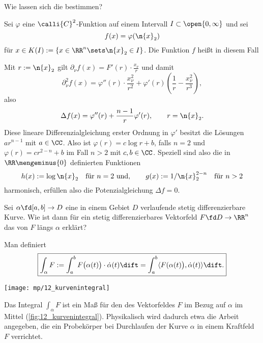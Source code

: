 \begin{frage}
  Wie lassen sich die  bestimmen?
\end{frage}

\begin{antwort}
  Sei $\varphi$ eine $\calli{C}^2$-Funktion auf einem 
  Intervall $I\subset\open{0,\infty}$ und sei 
  \[
  f(x)=\varphi(\n{x}_2)
  \]
  für $x\in K(I) := \{ x\in\RR^n\sets \n{x}_2 \in I\}$. 
  Die Funktion $f$ heißt in diesem Fall 

  Mit $r:=\n{x}_2$ gilt $\partial_\nu f(x) = F'( r )\cdot \frac{x_\nu}{r}$ 
  und damit
  \[
  \partial_\nu^2 f(x) = \varphi''( r ) \cdot \frac{x_\nu^2}{ r^2 } 
  + \varphi'(r) \left( \frac{1}{r} - \frac{x_\nu^2}{r^3} \right), 
  \]
  also 
  \[
  \Delta f(x) = \varphi''(r) + \frac{n-1}{r} \varphi'(r), \qquad r=\n{x}_2. 
  \]
  Diese lineare Differenzialgleichung erster Ordnung in $\varphi'$ 
  besitzt die Lösungen $ar^{n-1}$ mit $a\in\CC$. Also ist 
  $\varphi(r) = c \log r + b$, falls $n=2$ und 
  $\varphi(r) =  cr^{2-n}+b$ im Fall $n>2$ mit $c,b\in\CC$.
  Speziell sind also die in 
  $\RR\mengeminus\{0\}$ definierten 
  Funktionen
  \[
  h(x) := \log\n{x}_2\quad\text{für $n=2$ und}, \qquad
  g(x) := 1/\n{x}_2^{2-n}\quad \text{für $n>2$}
  \]
  harmonisch, erfüllen also die Potenzialgleichung $\Delta f=0$.\AntEnd
\end{antwort} 

\begin{frage}
  Sei $\alpha\fd [a,b]\to D$ eine in einem Gebiet $D$ 
  verlaufende stetig differenzierbare Kurve. Wie ist dann für ein 
  stetig differenzierbares Vektorfeld $F\fd D\to\RR^n$ das 
   von $F$ längs $\alpha$ erklärt?
\end{frage}

\begin{antwort}
  Man definiert 
  \[
  \boxed{
    \int_\alpha F := \int_a^b F \big( \alpha(t) \big) \cdot 
    \dot{\alpha}(t)\dift 
    = 
    \int_a^b \langle F ( \alpha(t) \big), \dot{\alpha}(t) \rangle \dift. 
  }
  \]

  \begin{center}
    \texttt{[image: mp/12\_kurvenintegral]}
    \label{fig:12_kurvenintegral}
  \end{center}

  Das Integral $\int_\alpha F$ ist ein Maß für den 
   des Vektorfeldes $F$ im Bezug 
  auf $\alpha$ im Mittel (\sieheAbbildung\ref{fig:12_kurvenintegral}). 
  Physikalisch wird dadurch etwa die Arbeit 
  angegeben, die ein Probekörper bei Durchlaufen der Kurve $\alpha$ 
  in einem Kraftfeld $F$ verrichtet. \AntEnd   
\end{antwort}

